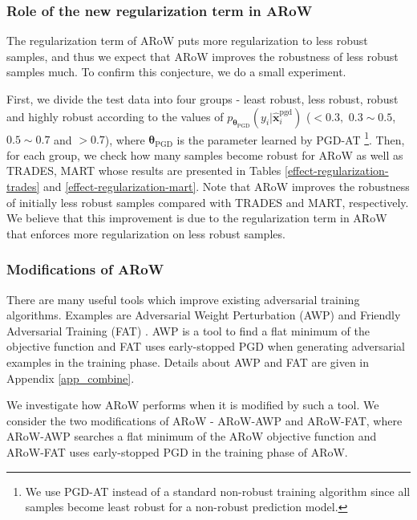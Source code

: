 \documentclass[nohyperref]{article}
\theoremstyle{plain}
\theoremstyle{definition}
\theoremstyle{remark}
\begin{document}
\subsubsection{Role of the new regularization term in ARoW}

The regularization term of ARoW puts
more regularization to less robust samples, and thus
we expect that ARoW improves the robustness of less robust samples much. 
To confirm this conjecture, we do a small experiment. 

First, we divide the test data into four groups - least robust, less robust, robust and highly robust
according to the values of
 $p_{\bm{\theta}_{\text{PGD}}}(y_i|\widehat{\bm{x}}_i^{\text{pgd}})$ ($<0.3,$ $0.3 \sim 0.5$,  $0.5 \sim 0.7$ and $>0.7$), where $\bm{\theta}_{\text{PGD}}$ is the parameter learned by
 PGD-AT \citep{madry2018towards}\footnote{We use PGD-AT instead of a standard non-robust
 training algorithm since all samples become least robust for a non-robust prediction model.}.
Then, for each group, we check how many samples become robust for ARoW as well as  TRADES, MART whose results are presented in Tables \ref{effect-regularization-trades} and \ref{effect-regularization-mart}.
Note that ARoW improves the robustness of initially less robust samples  compared with TRADES and MART, respectively.
We believe that this improvement is due to the regularization term in ARoW that enforces more regularization on less robust samples.

\subsubsection{Modifications of ARoW}

There are many useful tools which improve existing adversarial training algorithms.
Examples are Adversarial Weight Perturbation (AWP) \citep{wu2020adversarial} and Friendly Adversarial Training (FAT) \citep{zhang2020attacks}. 
AWP is a tool to find a flat minimum of the objective function
and FAT uses early-stopped PGD when generating adversarial examples in the training phase.
Details about AWP and FAT are given in Appendix \ref{app_combine}.

We investigate how ARoW performs  when it is modified by such a tool.
We consider the two  modifications of ARoW - ARoW-AWP and ARoW-FAT, where
ARoW-AWP searches a flat minimum of the ARoW objective function and
ARoW-FAT uses early-stopped PGD in the training phase of ARoW.
\end{document}
